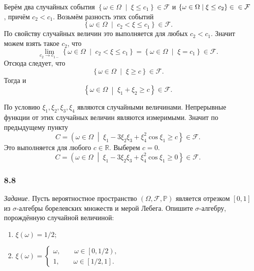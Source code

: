 Берём два случайных события $ \left\{ \omega \in \Omega \; \middle| \; \xi \leq c_1 \right\} \in \mathcal{F} $ и
$ \left\{ \omega \in \Omega \; \middle| \; \xi \leq c_2 \right\} \in \\
\in \mathcal{F} $, причём $c_2 < c_1$.
Возьмём разность этих событий
$$ \left\{ \omega \in \Omega \; \middle| \; c_2 < \xi \leq c_1 \right\} \in \mathcal{F}.$$
По свойству случайных величин это выполняется для любых $c_2 < c_1$.
Значит можем взять такое $c_2$, что
$$ \lim \limits_{c_2 \to c_{1-}} \left\{ \omega \in \Omega \; \middle| \; c_2 < \xi \leq c_1 \right\} =
\left\{ \omega \in \Omega \; \middle| \; \xi = c_1 \right\} \in \mathcal{F}.$$
Отсюда следует, что
$$ \left\{ \omega \in \Omega \; \middle| \; \xi \geq c \right\} \in \mathcal{F}.$$
Тогда и
$$ \left\{ \omega \in \Omega \; \middle| \; \xi_1 + \xi_2 \geq c \right\} \in \mathcal{F}.$$

По условию $ \xi_1, \xi_2, \xi_3, \xi_4$ являются случайными величинами.
Непрерывные функции от этих случайных величин являются измеримыми.
Значит по предыдущему пункту
$$C =
\left( \omega \in \Omega \; \middle| \; \xi_1 -3 \xi_2 \xi_3 + \xi_4^2 \cos \xi_1 \geq c \right\} \in
\mathcal{F}.$$
Это выполняется для любого $c \in \mathbb{R}$.
Выберем $c = 0$.
$$C =
\left( \omega \in \Omega \; \middle| \; \xi_1 -3 \xi_2 \xi_3 + \xi_4^2 \cos \xi_1 \geq 0 \right\} \in
\mathcal{F}.$$

\subsubsection*{8.8}

\textit{Задание.}
Пусть вероятностное пространство
$ \left( \Omega, \mathcal{F}, \mathbb{P} \right) $
является отрезком $ \left[ 0, 1 \right] $ из $ \sigma $-алгебры борелевских множеств и мерой Лебега.
Опишите $ \sigma $-алгебру, порождённую случайной величиной:
\begin{enumerate}[label=\alph*)]
\item $ \xi \left( \omega \right) = 1/2 $;
\item $ \xi \left( \omega \right) =
\begin{cases}
\omega, \qquad \omega \in \left[ 0, 1/2 \right), \\
1, \qquad \omega \in \left[ 1/2, 1 \right].
\end{cases} $
\end{enumerate}

